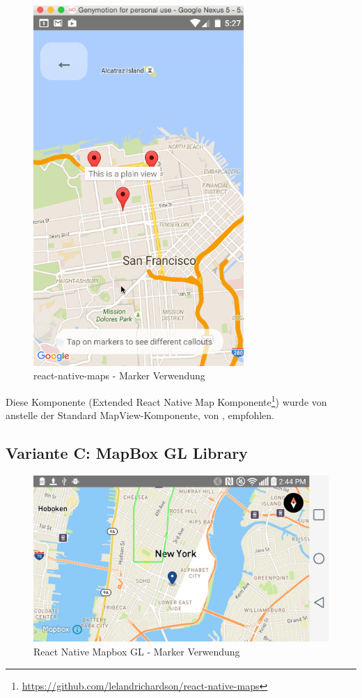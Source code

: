\begin{figure}[H]
	\centering
	\includegraphics[width=8cm]{images/technischer_bericht/lelandrichardson_react-native-maps.png}
	\caption{react-native-maps - Marker Verwendung}
	\label{image-variante-b-map}
\end{figure}

Diese Komponente (Extended React Native Map Komponente\footnote{\url{https://github.com/lelandrichardson/react-native-maps}}) wurde von  anstelle der Standard MapView-Komponente, von , empfohlen.


\subsection{Variante C: MapBox GL Library}

\begin{figure}[H]
	\centering
	\includegraphics[width=\textwidth]{images/technischer_bericht/react-native-mapbox-gl.jpg}
	\caption{React Native Mapbox GL - Marker Verwendung}
	\label{image-variante-b-map}
\end{figure}

